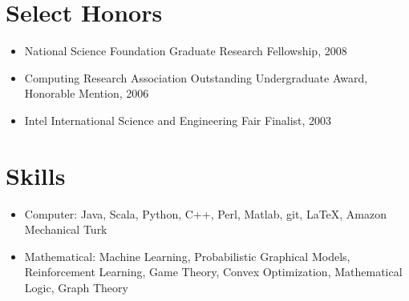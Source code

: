 \begin{resume}
\section{Select Honors}
\begin{itemize}
\item National Science Foundation Graduate Research Fellowship, 2008
\item Computing Research Association Outstanding Undergraduate Award, Honorable Mention, 2006
\item Intel International Science and Engineering Fair Finalist, 2003
\end{itemize}






 \section{\bf Skills}
 \begin{itemize}
 \item Computer: Java, Scala, Python, C++, Perl, Matlab, git, \LaTeX, Amazon Mechanical Turk 
 \item Mathematical: Machine Learning, Probabilistic Graphical Models, Reinforcement Learning, Game Theory, Convex Optimization, Mathematical Logic, Graph Theory
 \end{itemize}




\end{resume}



